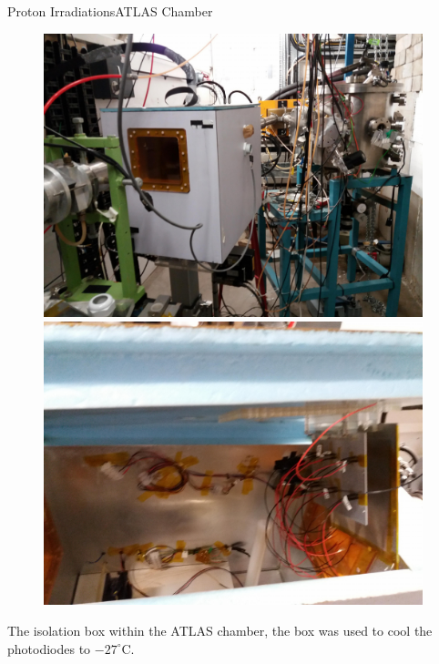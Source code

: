 \documentclass{beamer}
\begin{document}
    \begin{frame}{Proton Irradiations}{ATLAS Chamber}
        \begin{figure}
            \begin{minipage}[b]{0.5\linewidth}
            \centering
            \includegraphics[width = 0.98\textwidth]{ATLAS_chamber.jpg}
        \end{minipage}%
        \begin{minipage}[b]{0.5\linewidth}
            \centering
            \includegraphics[width = 0.98\textwidth]{Isolation_box.jpg}
        \end{minipage}
        \end{figure}
        The isolation box within the ATLAS chamber, the box was used to cool the photodiodes to $-27^{\circ}$C.
    \end{frame}
\end{document}
